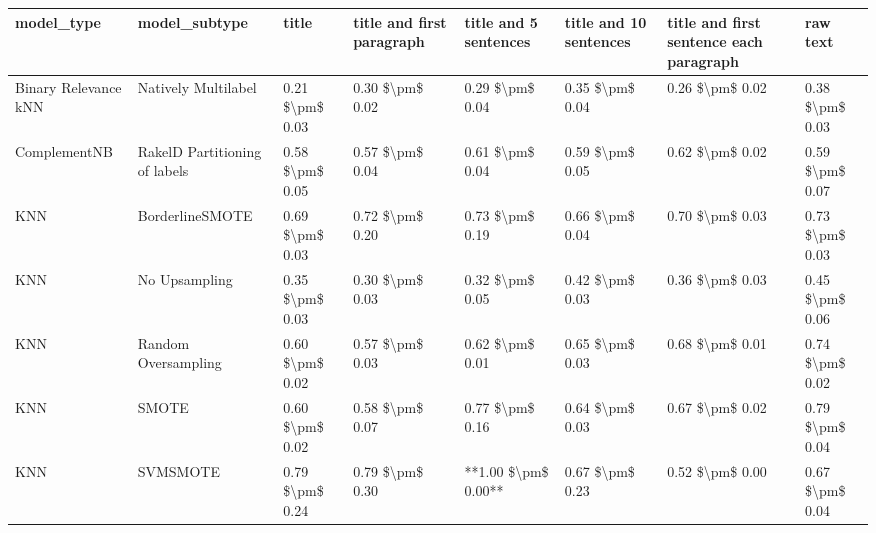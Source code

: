 \begin{tabular}{llllllll}
\toprule
                     model\_type &                 model\_subtype &           title & title and first paragraph & title and 5 sentences & title and 10 sentences & title and first sentence each paragraph &        raw text \\
\midrule
           Binary Relevance kNN &           Natively Multilabel & 0.21 \$\textbackslash pm\$ 0.03 &           0.30 \$\textbackslash pm\$ 0.02 &       0.29 \$\textbackslash pm\$ 0.04 &        0.35 \$\textbackslash pm\$ 0.04 &                         0.26 \$\textbackslash pm\$ 0.02 & 0.38 \$\textbackslash pm\$ 0.03 \\
                   ComplementNB & RakelD Partitioning of labels & 0.58 \$\textbackslash pm\$ 0.05 &           0.57 \$\textbackslash pm\$ 0.04 &       0.61 \$\textbackslash pm\$ 0.04 &        0.59 \$\textbackslash pm\$ 0.05 &                         0.62 \$\textbackslash pm\$ 0.02 & 0.59 \$\textbackslash pm\$ 0.07 \\
                            KNN &               BorderlineSMOTE & 0.69 \$\textbackslash pm\$ 0.03 &           0.72 \$\textbackslash pm\$ 0.20 &       0.73 \$\textbackslash pm\$ 0.19 &        0.66 \$\textbackslash pm\$ 0.04 &                         0.70 \$\textbackslash pm\$ 0.03 & 0.73 \$\textbackslash pm\$ 0.03 \\
                            KNN &                 No Upsampling & 0.35 \$\textbackslash pm\$ 0.03 &           0.30 \$\textbackslash pm\$ 0.03 &       0.32 \$\textbackslash pm\$ 0.05 &        0.42 \$\textbackslash pm\$ 0.03 &                         0.36 \$\textbackslash pm\$ 0.03 & 0.45 \$\textbackslash pm\$ 0.06 \\
                            KNN &           Random Oversampling & 0.60 \$\textbackslash pm\$ 0.02 &           0.57 \$\textbackslash pm\$ 0.03 &       0.62 \$\textbackslash pm\$ 0.01 &        0.65 \$\textbackslash pm\$ 0.03 &                         0.68 \$\textbackslash pm\$ 0.01 & 0.74 \$\textbackslash pm\$ 0.02 \\
                            KNN &                         SMOTE & 0.60 \$\textbackslash pm\$ 0.02 &           0.58 \$\textbackslash pm\$ 0.07 &       0.77 \$\textbackslash pm\$ 0.16 &        0.64 \$\textbackslash pm\$ 0.03 &                         0.67 \$\textbackslash pm\$ 0.02 & 0.79 \$\textbackslash pm\$ 0.04 \\
                            KNN &                      SVMSMOTE & 0.79 \$\textbackslash pm\$ 0.24 &           0.79 \$\textbackslash pm\$ 0.30 &   **1.00 \$\textbackslash pm\$ 0.00** &        0.67 \$\textbackslash pm\$ 0.23 &                         0.52 \$\textbackslash pm\$ 0.00 & 0.67 \$\textbackslash pm\$ 0.04 \\

\end{tabular}
